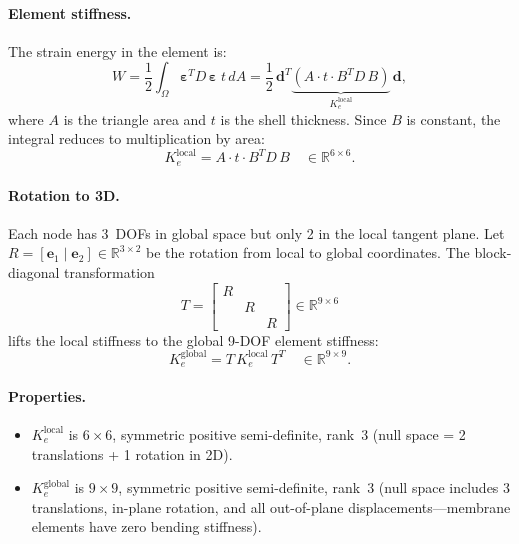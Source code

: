 \paragraph{Element stiffness.}
The strain energy in the element is:
\begin{equation}
  W = \frac{1}{2} \int_\Omega \boldsymbol{\varepsilon}^T D\, \boldsymbol{\varepsilon}\; t\, dA
    = \frac{1}{2}\, \mathbf{d}^T \underbrace{\left( A \cdot t \cdot B^T D\, B \right)}_{K_e^{\text{local}}}\, \mathbf{d},
\end{equation}
where $A$ is the triangle area and $t$ is the shell thickness. Since $B$ is constant, the integral reduces to multiplication by area:
\begin{equation}
  K_e^{\text{local}} = A \cdot t \cdot B^T D\, B \quad \in \mathbb{R}^{6 \times 6}.
\end{equation}

\paragraph{Rotation to 3D.}
Each node has 3~DOFs in global space but only 2 in the local tangent plane. Let $R = [\mathbf{e}_1 \mid \mathbf{e}_2] \in \mathbb{R}^{3 \times 2}$ be the rotation from local to global coordinates. The block-diagonal transformation
\begin{equation}
  T = \begin{bmatrix} R & & \\ & R & \\ & & R \end{bmatrix} \in \mathbb{R}^{9 \times 6}
\end{equation}
lifts the local stiffness to the global 9-DOF element stiffness:
\begin{equation}
  K_e^{\text{global}} = T\, K_e^{\text{local}}\, T^T \quad \in \mathbb{R}^{9 \times 9}.
\end{equation}

\paragraph{Properties.}
\begin{itemize}
  \item $K_e^{\text{local}}$ is $6 \times 6$, symmetric positive semi-definite, rank~3 (null space = 2 translations + 1 rotation in 2D).
  \item $K_e^{\text{global}}$ is $9 \times 9$, symmetric positive semi-definite, rank~3 (null space includes 3 translations, in-plane rotation, and all out-of-plane displacements---membrane elements have zero bending stiffness).
\end{itemize}


